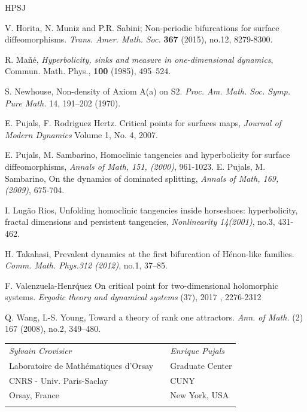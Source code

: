 \documentclass[a4paper,11pt]{article}
\theoremstyle{definition}
\begin{document}
\begin{thebibliography}{HPSJ}
{ V. Horita, N. Muniz and P.R.  Sabini;
Non-periodic bifurcations for surface diffeomorphisms.
\emph{Trans. Amer. Math. Soc.} {\bf 367} (2015), no.12, 8279-8300.

 R. Ma{\~n}{\'e}, \emph{Hyperbolicity, sinks and measure in one-dimensional
dynamics}, Commun. Math. Phys., {\bf 100} (1985), 495--524.

 S. Newhouse, Non-density of Axiom A(a) on S2. {\em Proc. Am. Math. Soc. Symp. Pure Math.} 14,
191–202 (1970).



 E. Pujals, F. Rodriguez Hertz. Critical points for surfaces maps, {\em
Journal of Modern Dynamics} Volume 1, No. 4, 2007.

 E. Pujals, M. Sambarino, Homoclinic
tangencies and hyperbolicity for surface diffeomorphisms, {\em
Annals of Math,  151, (2000)}, 961-1023.
 E. Pujals, M. Sambarino, On the dynamics of dominated splitting, {\em
Annals of Math,  169, (2009)}, 675-704.


 I. Lug\~ao Rios, 
Unfolding homoclinic tangencies inside horseshoes: hyperbolicity, fractal dimensions and persistent tangencies,
{\it Nonlinearity 14(2001)}, no.3, 431-462.


  H. Takahasi,
Prevalent dynamics at the first bifurcation of Hénon-like families.
{\it Comm. Math. Phys.312 (2012)}, no.1, 37–85.

 F. Valenzuela-Henr\'quez   
 On critical point for two-dimensional holomorphic systems. {\em Ergodic theory and dynamical systems} (37),  2017 , 2276-2312


 Q. Wang, L-S. Young, Toward a theory of rank one attractors. {\em Ann. of Math.} (2) 167
(2008), no.2, 349–480.

}
\end{thebibliography}


\begin{tabular}{l l l}
\emph{Sylvain Crovisier} &&
\emph{Enrique Pujals}\\

Laboratoire de Math\'ematiques d'Orsay &&
Graduate Center \\

CNRS - Univ. Paris-Saclay &&
CUNY\\

Orsay, France &&
New York, USA\\

&&\\


\end{tabular}
\end{document}
